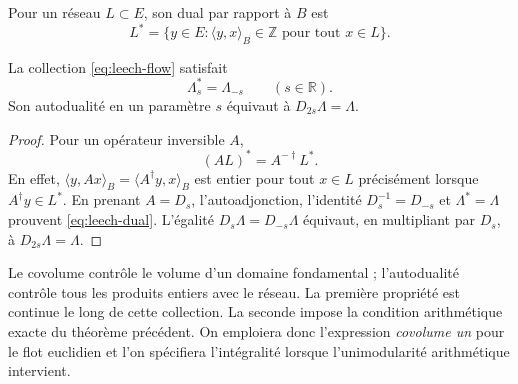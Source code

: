 \begin{definition}
Pour un réseau \(L\subset E\), son dual par rapport à \(B\) est
\[
 L^*=\{y\in E:\langle y,x\rangle_B\in\mathbb Z
                         \text{ pour tout }x\in L\}.
\]
\end{definition}

\begin{theorem}
\label{thm:leech-dual}
La collection \eqref{eq:leech-flow} satisfait
\begin{equation}
 \Lambda_s^*=\Lambda_{-s}\qquad(s\in\mathbb R).
 \label{eq:leech-dual}
\end{equation}
Son autodualité en un paramètre \(s\) équivaut à
\(D_{2s}\Lambda=\Lambda\).
\end{theorem}
\begin{proof}
Pour un opérateur inversible \(A\),
\[
 (AL)^*=A^{-\dagger}L^*.
\]
En effet, \(\langle y,Ax\rangle_B=\langle A^\dagger y,x\rangle_B\)
est entier pour tout \(x\in L\) précisément lorsque
\(A^\dagger y\in L^*\). En prenant \(A=D_s\), l’autoadjonction,
l’identité \(D_s^{-1}=D_{-s}\) et \(\Lambda^*=\Lambda\) prouvent
\eqref{eq:leech-dual}. L’égalité
\(D_s\Lambda=D_{-s}\Lambda\) équivaut, en multipliant par \(D_s\),
à \(D_{2s}\Lambda=\Lambda\).
\end{proof}

Le covolume contrôle le volume d'un domaine fondamental ; l'autodualité contrôle tous les produits entiers avec le réseau. La première propriété est continue le long de cette collection. La seconde impose la condition arithmétique exacte du théorème précédent. On emploiera donc l'expression \emph{covolume un} pour le flot euclidien et l'on spécifiera l'intégralité lorsque l'unimodularité arithmétique intervient.

